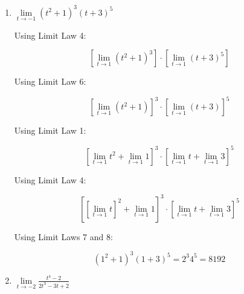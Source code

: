 \documentclass{article}
\begin{document}
\begin{enumerate}
		\item $\lim \limits _{t \to -1} (t^2 + 1)^3 (t + 3)^5$
		
			Using Limit Law 4:
			
			$$[\lim \limits _{t \to 1} (t^2 + 1)^3] \cdot [\lim \limits _{t \to 1} (t + 3)^5]$$
			
			Using Limit Law 6:
			
			$$[\lim \limits _{t \to 1} (t^2 + 1)]^3 \cdot [\lim \limits _{t \to 1} (t + 3)]^5$$
			
			Using Limit Law 1:
			
			$$[\lim \limits _{t \to 1} t^2 + \lim \limits _{t \to 1} 1]^3 \cdot [\lim \limits _{t \to 1} t + \lim \limits _{t \to 1} 3]^5$$
			
			Using Limit Law 4:
			
			$$[[\lim \limits _{t \to 1} t]^2 + \lim \limits _{t \to 1} 1]^3 \cdot [\lim \limits _{t \to 1} t + \lim \limits _{t \to 1} 3]^5$$
			
			Using Limit Laws 7 and 8:
			
			$$(1^2 + 1)^3 (1 + 3)^5 = 2^3 4^5 = 8192$$
			
		\item $\lim \limits _{t \to -2} \frac{t^4 - 2}{2t^3 - 3t + 2}$
		
	\end{enumerate}
\end{document}
